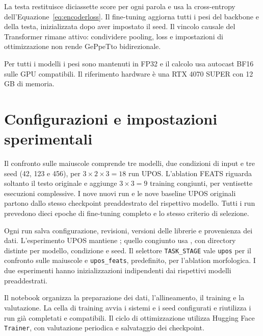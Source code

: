 \documentclass[12pt,a4paper]{report}
\begin{document}
La testa restituisce diciassette score per ogni parola e usa la cross-entropy dell'Equazione~\ref{eq:encoderloss}. Il fine-tuning aggiorna tutti i pesi del backbone e della testa, inizializzata dopo aver impostato il seed. Il vincolo causale del Transformer rimane attivo: condividere pooling, loss e impostazioni di ottimizzazione non rende GePpeTto bidirezionale.

Per tutti i modelli i pesi sono mantenuti in FP32 e il calcolo usa autocast BF16 sulle GPU compatibili. Il riferimento hardware è una RTX 4070 SUPER con 12 GB di memoria.

\section{Configurazioni e impostazioni sperimentali}
\label{sec:configuration}
Il confronto sulle maiuscole comprende tre modelli, due condizioni di input e tre seed (42, 123 e 456), per $3\times2\times3=18$ run UPOS. L'ablation FEATS riguarda soltanto il testo originale e aggiunge $3\times3=9$ training congiunti, per ventisette esecuzioni complessive. I nove nuovi run e le nove baseline UPOS originali partono dallo stesso checkpoint preaddestrato del rispettivo modello. Tutti i run prevedono dieci epoche di fine-tuning completo e lo stesso criterio di selezione.

Ogni run salva configurazione, revisioni, versioni delle librerie e provenienza dei dati. L'esperimento UPOS mantiene ; quello congiunto usa , con directory distinte per modello, condizione e seed. Il selettore \texttt{TASK\_STAGE} vale \texttt{upos} per il confronto sulle maiuscole e \texttt{upos\_feats}, predefinito, per l'ablation morfologica. I due esperimenti hanno inizializzazioni indipendenti dai rispettivi modelli preaddestrati.

Il notebook  organizza la preparazione dei dati, l'allineamento, il training e la valutazione. La cella di training avvia i sistemi e i seed configurati e riutilizza i run già completati e compatibili. Il ciclo di ottimizzazione utilizza Hugging Face \texttt{Trainer}, con valutazione periodica e salvataggio dei checkpoint.
\end{document}
